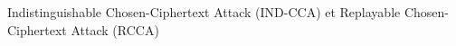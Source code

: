 \begin{frame}{Indistinguishable Chosen-Ciphertext Attack (IND-CCA) et Replayable Chosen-Ciphertext Attack (RCCA)}


\end{frame}
